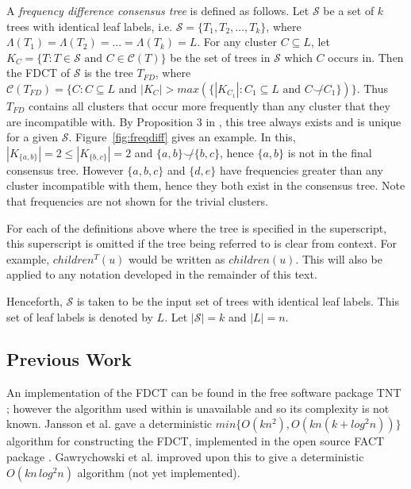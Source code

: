 \documentclass{article}
\newcommand{\compatible}{\smile}
\newcommand{\leafset}{\Lambda}
\begin{document}
    A \textit{frequency difference consensus tree} is defined as follows. Let $\mathcal{S}$ be a set of $k$ trees with identical leaf labels, i.e. $\mathcal{S} = \{T_1, T_2, ..., T_k\}$, where $\leafset(T_1) = \leafset(T_2) = ... = \leafset(T_k) = L$. For any cluster $C \subseteq L$, let $K_C = \{T : T \in \mathcal{S} \text{ and } C \in \mathcal{C}(T)\}$ be the set of trees in $\mathcal{S}$ which $C$ occurs in. Then the FDCT of $\mathcal{S}$ is the tree $T_{FD}$, where $\mathcal{C}(T_{FD}) = \{C : C \subseteq L \text{ and } |K_C| > max(\{|K_{C_1}| : C_1 \subseteq L \text{ and } C \not\compatible C_1\})\}$. Thus $T_{FD}$ contains all clusters that occur more frequently than any cluster that they are incompatible with. By Proposition $3$ in \cite{steel2014axiomatic}, this tree always exists and is unique for a given $\mathcal{S}$. Figure~\ref{fig:freqdiff} gives an example. In this, $|K_{\{a, b\}}| = 2 \leq |K_{\{b, c\}}| = 2$ and $\{a, b\} \not\compatible \{b, c\}$, hence $\{a, b\}$ is not in the final consensus tree. However $\{a, b, c\}$ and $\{d, e\}$ have frequencies greater than any cluster incompatible with them, hence they both exist in the consensus tree. Note that frequencies are not shown for the trivial clusters.

    For each of the definitions above where the tree is specified in the superscript, this superscript is omitted if the tree being referred to is clear from context. For example, $children^T(u)$ would be written as $children(u)$. This will also be applied to any notation developed in the remainder of this text.

    Henceforth, $\mathcal{S}$ is taken to be the input set of trees with identical leaf labels. This set of leaf labels is denoted by $L$. Let $|\mathcal{S}| = k$ and $|L| = n$.

    \subsection{Previous Work}
    An implementation of the FDCT can be found in the free software package TNT \cite{goloboff2008tnt}; however the algorithm used within is unavailable and so its complexity is not known. Jansson et al. \cite{jansson2018algorithms} gave a deterministic $min\{O(kn^2), O(kn(k + log^2 n))\}$ algorithm for constructing the FDCT, implemented in the open source FACT package \cite{jansson2016improved}. Gawrychowski et al. \cite{gawrychowski2017faster} improved upon this to give a deterministic $O(kn\,log^2n)$ algorithm (not yet implemented).
\end{document}
